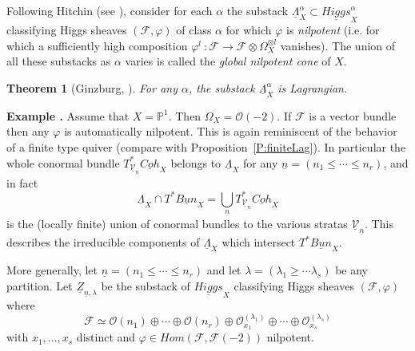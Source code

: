 \documentclass[a4paper,10pt]{amsart}
\def\a{\alpha}
\newtheorem{theo}{\bf{Theorem}}[section]
\numberwithin{equation}{section}
\begin{document}
\vspace{.2in}

Following Hitchin (see \cite{Hitchin}), consider for each $\a$ the substack $\underline{\Lambda}^{\a}_X \subset \underline{Higgs}^{\a}_X$ classifying Higgs sheaves $(\mathcal{F},\varphi)$ of class $\a$ for which $\varphi$ is \textit{nilpotent} (i.e. for which a sufficiently high composition $\varphi ^l~: \mathcal{F} \to \mathcal{F}\otimes \Omega_X^{\otimes l}$ vanishes). The union of all these substacks as $\a$ varies is called the \textit{global nilpotent cone} of $X$.

\vspace{.1in}

\begin{theo}[Ginzburg, \cite{Ginzburg}] For any $\a$, the substack $\underline{\Lambda}^{\a}_X$ is Lagrangian.
\end{theo}

\vspace{.2in}

\addtocounter{theo}{1}
\noindent \textbf{Example \thetheo .} Assume that $X=\mathbb{P}^1$. Then $\Omega_X = \mathcal{O}(-2)$. If $\mathcal{F}$ is a vector bundle then any $\varphi$ is automatically nilpotent. This is again reminiscent of the behavior of a finite type quiver (compare with Proposition~\ref{P:finiteLag}). In particular the whole conormal bundle $T^*_{\underline{\mathcal{V}}_{\underline{n}}}\underline{Coh}_{X}$ belongs to $\underline{\Lambda}_X$ for any $\underline{n}=(n_1 \leq \cdots \leq n_r)$, and in fact
$$\underline{\Lambda}_X \cap T^*\underline{Bun}_X=\bigcup_{\underline{n}} T^*_{\underline{\mathcal{V}}_{\underline{n}}}\underline{Coh}_{X}$$
is the (locally finite) union of conormal bundles to the various stratas $\underline{\mathcal{V}}_{\underline{n}}$. This describes the irreducible components of $\underline{\Lambda}_X$ which intersect $T^*\underline{Bun}_X$.

More generally, let $\underline{n}=(n_1 \leq \cdots \leq n_r)$ and let $\lambda=(\lambda_1 \geq \cdots \lambda_s)$ be any partition. Let $\underline{Z}_{\underline{n},\lambda}$ be the substack of $\underline{Higgs}_X$ classifying Higgs sheaves $(\mathcal{F},\varphi)$ where 
$$\mathcal{F}\simeq \mathcal{O}(n_1) \oplus \cdots \oplus \mathcal{O}(n_r) \oplus \mathcal{O}_{x_1}^{(\lambda_1)} \oplus \cdots \oplus \mathcal{O}_{x_s}^{(\lambda_s)}$$
with $x_1, \ldots, x_s$ distinct and $\varphi \in Hom(\mathcal{F}, \mathcal{F}(-2))$ nilpotent. 

\vspace{.1in}
\end{document}
